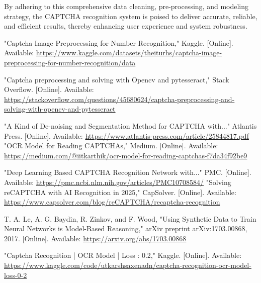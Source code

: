 \documentclass[sigconf]{acmart}
\begin{document}
By adhering to this comprehensive data cleaning, pre-processing, and modeling strategy, the CAPTCHA recognition system is poised to deliver accurate, reliable, and efficient results, thereby enhancing user experience and system robustness.


\begin{thebibliography}{9} 
 "Captcha Image Preprocessing for Number Recognition," Kaggle. [Online]. Available: \url{https://www.kaggle.com/datasets/theiturhs/captcha-image-preprocessing-for-number-recognition/data} 

 "Captcha preprocessing and solving with Opencv and pytesseract," Stack Overflow. [Online]. Available: \url{https://stackoverflow.com/questions/45680624/captcha-preprocessing-and-solving-with-opencv-and-pytesseract} 

 "A Kind of De-noising and Segmentation Method for CAPTCHA with..." Atlantis Press. [Online]. Available: \url{https://www.atlantis-press.com/article/25844817.pdf}  "OCR Model for Reading CAPTCHAs," Medium. [Online]. Available: \url{https://medium.com/@iitkarthik/ocr-model-for-reading-captchas-f7da34f92be9}

 "Deep Learning Based CAPTCHA Recognition Network with..." PMC. [Online]. Available: \url{https://pmc.ncbi.nlm.nih.gov/articles/PMC10708584/}  "Solving reCAPTCHA with AI Recognition in 2025," CapSolver. [Online]. Available: \url{https://www.capsolver.com/blog/reCAPTCHA/recaptcha-recognition}

 T. A. Le, A. G. Baydin, R. Zinkov, and F. Wood, "Using Synthetic Data to Train Neural Networks is Model-Based Reasoning," arXiv preprint arXiv:1703.00868, 2017. [Online]. Available: \url{https://arxiv.org/abs/1703.00868}

 "Captcha Recognition | OCR Model | Loss : 0.2," Kaggle. [Online]. Available: \url{https://www.kaggle.com/code/utkarshsaxenadn/captcha-recognition-ocr-model-loss-0-2} \end{thebibliography}
\end{document}
